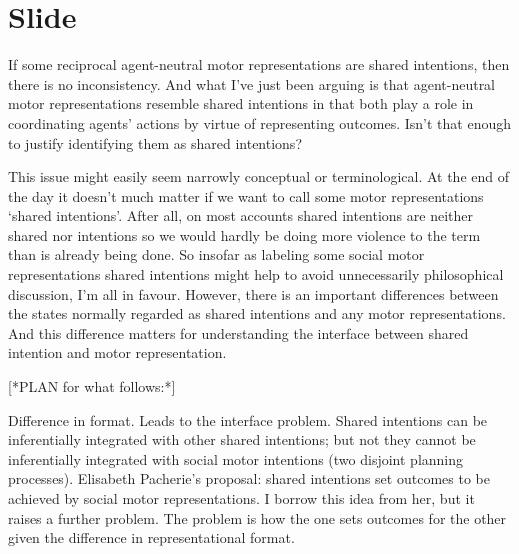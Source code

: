 \documentclass[12pt,\papersize]{extarticle}
\begin{document}
\section{Slide}
If some reciprocal agent-neutral motor representations are shared intentions, then there is no inconsistency.
And what I’ve just been arguing is that agent-neutral motor representations resemble shared intentions in that both play a role in coordinating agents’ actions by virtue of representing outcomes.  Isn’t that enough to justify identifying them as shared intentions?

This issue might easily seem narrowly conceptual or terminological.  
At the end of the day it doesn’t much matter if we want to call some motor representations ‘shared intentions’.  
After all, on most accounts shared intentions are neither shared nor intentions so we would hardly be doing more violence to the term than is already being done.  
So insofar as labeling some social motor representations shared intentions might help to avoid unnecessarily philosophical discussion, I’m all in favour.
However, there is an important differences between the states normally regarded as  shared intentions and any motor representations.
And this difference matters for understanding the interface between shared intention and motor representation.


[*PLAN for what follows:*]

Difference in format.
Leads to the interface problem.  
Shared intentions can be inferentially integrated with other shared intentions; but not they cannot be inferentially integrated with social motor intentions (two disjoint planning processes).  
Elisabeth Pacherie’s proposal: shared intentions set outcomes to be achieved by social motor representations.  
I borrow this idea from her, but it raises a further problem.
The problem is how the one sets outcomes for the other given the difference in representational format.
\end{document}

